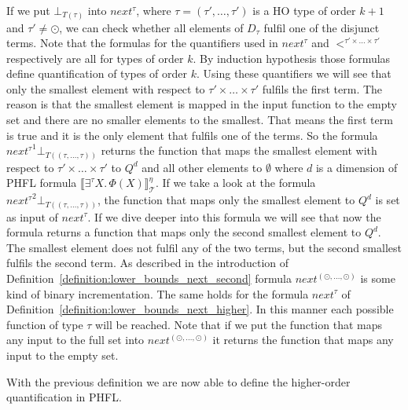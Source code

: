 \begin{remark}
\label{remark:lower_bounds_next_higher}
    If we put $\bot_{T(\tau)}$ into $next^{\tau}$, where $\tau = (\tau', \dots, \tau')$ is a HO type of order $k+1$ and $\tau'\neq \odot$, we can check whether all elements of $D_{\tau}$  fulfil one of 
    the disjunct terms. Note that the formulas for the quantifiers used in $next^\tau$ and $<^{\tau'\times\dots\times\tau'}$ respectively are all for types of order $k$. By induction hypothesis those formulas define quantification of types of order $k$. Using these quantifiers we will see that only the smallest element with respect to $\tau'\times\dots\times\tau'$ fulfils the first term. 
The reason is that the 
    smallest element is mapped in the input function to the empty set and there are no smaller elements to the smallest. 
    That means the first term is true and it is the only element that fulfils one of the terms. So the 
    formula ${next^{\tau}}^1 \bot_{T((\tau, \dots, \tau))}$ returns the function that maps the smallest element with respect to $\tau'\times\dots\times\tau'$ to $Q^d$ and all other elements to $\emptyset$ where $d$ is a dimension of PHFL formula $
    \llbracket \exists^\tau X.\,\Phi(X)\rrbracket^\eta_\mathcal{T}$. If we take a look at the formula $
    {next^{\tau}}^2 \bot_{T((\tau, \dots, \tau))}$, the function that maps only the smallest element to $Q^d$ is set as input of
    $next^{\tau}$. If we dive deeper into this formula we will see that now the formula 
    returns a function that maps only the second smallest element to $Q^d$. The smallest element does not 
    fulfil any of the two terms, but the second smallest fulfils the second term. As described in the 
    introduction of Definition~\ref{definition:lower_bounds_next_second} formula $next^{(\odot, 
    \dots, \odot)}$ is some kind of binary incrementation. The same holds for the formula $next^\tau$ of Definition~\ref{definition:lower_bounds_next_higher}. In this manner each possible function of 
    type $\tau$ will be reached. Note that if we put the function that maps any input to the full set into $next^{(\odot, 
	\dots, \odot)}$ it returns the function that maps any input to the empty set.
\end{remark}

With the previous definition we are now able to define the higher-order quantification in PHFL.


